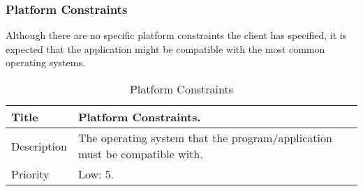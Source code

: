 \subsubsection{Platform Constraints}
  \label{system-constraints/budget-and-schedule/platform-title}
  Although there are no specific platform constraints the client
 has specified, it is expected that the application might be
compatible with the most common operating systems.

  \begin{table}[h!]
    \caption{Platform Constraints}
    \label{system-constraints/platform/platform-table}
    \begin{tabularx}{\textwidth}{|l|X|}
      \hline
      Title       & Platform Constraints. \\ \hline
Description &   The operating system that the program/application must be compatible with. \\ \hline
      Priority    & Low: 5. \\ \hline
    \end{tabularx}
  \end{table}

